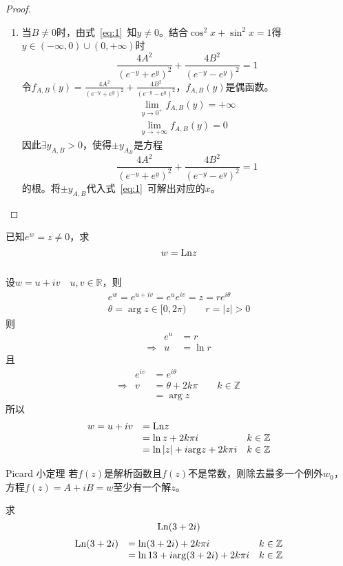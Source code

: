 \begin{homeworkProblem}
\begin{proof}
\begin{enumerate}
    \item 当$B\neq0$时，由式~\eqref{eq:1}~知$y\neq0$。结合$\cos^2x+\sin^2x=1$得$y\in(-\infty,0)\cup(0,+\infty)$时
    \[
    \frac{4A^2}{(e^{-y}+e^y)^2} + \frac{4B^2}{(e^{-y}-e^y)^2} = 1
    \]
    令$f_{A,B}(y) = \frac{4A^2}{(e^{-y}+e^y)^2} + \frac{4B^2}{(e^{-y}-e^y)^2}$，$f_{A,B}(y)$是偶函数。
    \begin{gather*}
        \lim_{y\rightarrow0^{+}}f_{A,B}(y) = +\infty\\
        \lim_{y\rightarrow+\infty}f_{A,B}(y) = 0
    \end{gather*}
    因此$\exists y_{A,B} > 0$，使得$\pm y_{A_B}$是方程
    \[
        \frac{4A^2}{(e^{-y}+e^y)^2} + \frac{4B^2}{(e^{-y}-e^y)^2} = 1
    \]
    的根。将$\pm y_{A,B}$代入式~\eqref{eq:1}~可解出对应的$x$。
\end{enumerate}
\end{proof}
\end{homeworkProblem}
\begin{homeworkProblem}
    已知$e^w=z\neq0$，求\[w=\mathrm{Ln} z\]\\
\solution
设$w=u+iv\quad u,v\in \mathbb{R}$，则
\begin{gather*}
e^w = e^{u+iv} = e^ue^{iv} = z = re^{i\theta} \\
\theta = \arg z \in [0,2\pi)\qquad r = |z| > 0
\end{gather*}
则
\[\begin{array}{lll}
&e^u &= r \\
\Rightarrow& u &= \ln r
\end{array}\]
且
\[\begin{array}{lll}
&e^{iv} &= e^{i\theta} \\
\Rightarrow& v &= \theta + 2k\pi \qquad k\in\mathbb{Z}\\
&&= \arg z
\end{array}\]
所以
\[\begin{array}{lll}
w = u+iv &= \mathrm{Ln} z  &\\
&= \ln z + 2k\pi i & k\in \mathbb{Z} \\
&= \ln|z| + i\mathrm{arg} z + 2k\pi i & k\in \mathbb{Z}
\end{array}\]
\begin{theorem*}{Picard 小定理}
若$f(z)$是解析函数且$f(z)$不是常数，则除去最多一个例外$w_0$，方程$f(z)=A+iB=w$至少有一个解$z$。
\end{theorem*}
\end{homeworkProblem}

\begin{homeworkProblem}
求\[\mathrm{Ln} (3+2i)\]
\solution
\[\begin{array} {lll}
\mathrm{Ln} (3+2i) &= \ln(3+2i) + 2k\pi i & k\in\mathbb{Z}\\
&= \ln13 + i\mathrm{arg}(3+2i) + 2k\pi i & k\in\mathbb{Z}
\end{array} \]
\end{homeworkProblem}

